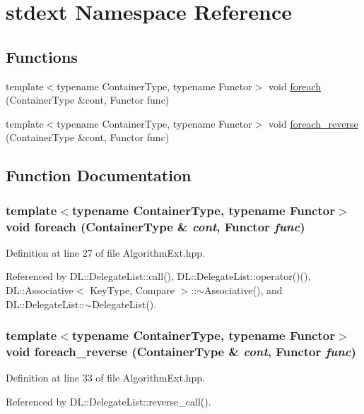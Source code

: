 \hypertarget{namespacestdext}{
\section{stdext Namespace Reference}
\label{namespacestdext}
}


\subsection*{Functions}
\begin{CompactItemize}
\item 
template$<$typename Container\-Type, typename Functor$>$ void \hyperlink{namespacestdext_a0}{foreach} (Container\-Type \&cont, Functor func)
\item 
template$<$typename Container\-Type, typename Functor$>$ void \hyperlink{namespacestdext_a1}{foreach\_\-reverse} (Container\-Type \&cont, Functor func)
\end{CompactItemize}


\subsection{Function Documentation}
\hypertarget{namespacestdext_a0}{
\subsubsection[foreach]{\setlength{\rightskip}{0pt plus 5cm}template$<$typename Container\-Type, typename Functor$>$ void foreach (Container\-Type \& {\em cont}, Functor {\em func})}}
\label{namespacestdext_a0}




Definition at line 27 of file Algorithm\-Ext.hpp.

Referenced by DL::Delegate\-List::call(), DL::Delegate\-List::operator()(), DL::Associative$<$ Key\-Type, Compare $>$::$\sim$Associative(), and DL::Delegate\-List::$\sim$Delegate\-List().\hypertarget{namespacestdext_a1}{
\subsubsection[foreach\_\-reverse]{\setlength{\rightskip}{0pt plus 5cm}template$<$typename Container\-Type, typename Functor$>$ void foreach\_\-reverse (Container\-Type \& {\em cont}, Functor {\em func})}}
\label{namespacestdext_a1}




Definition at line 33 of file Algorithm\-Ext.hpp.

Referenced by DL::Delegate\-List::reverse\_\-call().